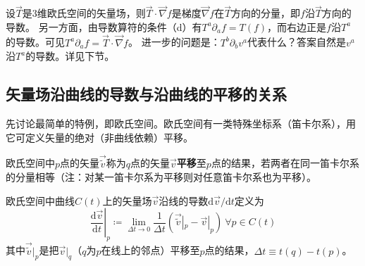 设$\vec{T}$是$3$维欧氏空间的矢量场，则$\vec{T}\cdot\vec{\nabla}f$是梯度$\vec{\nabla}f$在$\vec{T}$方向的分量，即$f$沿$\vec{T}$方向的导数。
另一方面，由导数算符的条件（d）有$T^a\partial_af = T(f)$，而右边正是$f$沿$T^a$的导数。可见$T^a\partial_af = \vec{T}\cdot\vec{\nabla}f$。
进一步的问题是：$T^b\partial_bv^a$代表什么？答案自然是$v^a$沿$T^a$的导数。详见下节。

\subsection{矢量场沿曲线的导数与沿曲线的平移的关系}

先讨论最简单的特例，即欧氏空间。欧氏空间有一类特殊坐标系（笛卡尔系），用它可定义矢量的绝对（非曲线依赖）平移。

\begin{definition}
欧氏空间中$p$点的矢量$\vec{\tilde{v}}$称为$q$点的矢量$\vec{v}$\textbf{平移}至$p$点的结果，若两者在同一笛卡尔系的分量相等（注：对某一笛卡尔系为平移则对任意笛卡尔系也为平移）。
\end{definition}

\begin{definition}
欧氏空间中曲线$C(t)$上的矢量场$\vec{v}$沿线的导数$\mathrm{d}\vec{v} / \mathrm{d}t$定义为
$$\left.\frac{\mathrm{d}\vec{v}}{\mathrm{d}t}\right|_p \coloneq \lim_{\Delta t \to 0}\frac{1}{\Delta t}(\vec{\tilde v}|_p - \vec{v}|_p) ~ \forall p \in C(t)$$
其中$\vec{\tilde v}|_p$是把$\vec{v}|_q$（$q$为$p$在线上的邻点）平移至$p$点的结果，$\Delta t \equiv t(q) - t(p)$。
\end{definition}

